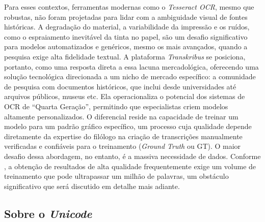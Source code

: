 \documentclass[portuguese]{textolivre}
\begin{document}
Para esses contextos, ferramentas modernas como o \textit{Tesseract OCR}, mesmo que robustas, não foram projetadas para lidar com a ambiguidade visual de fontes históricas. A degradação do material, a variabilidade da impressão e os ruídos, como o espraiamento inevitável da tinta no papel, são um desafio significativo para modelos automatizados e genéricos, mesmo os mais avançados, quando a pesquisa exige alta fidelidade textual. A plataforma \textit{Transkribus} se posiciona, portanto, como uma resposta direta a essa lacuna mercadológica, oferecendo uma solução tecnológica direcionada a um nicho de mercado específico: a comunidade de pesquisa com documentos históricos, que inclui desde universidades até arquivos públicos, museus etc. Ela operacionaliza o potencial dos sistemas de OCR de “Quarta Geração”, permitindo que especialistas criem modelos altamente personalizados. O diferencial reside na capacidade de treinar um modelo para um padrão gráfico específico, um processo cuja qualidade depende diretamente da expertise do filólogo na criação de transcrições manualmente verificadas e confiáveis para o treinamento (\textit{Ground Truth }ou GT). O maior desafio dessa abordagem, no entanto, é a massiva necessidade de dados. Conforme \textcite[p.~18]{wang2021object}, a obtenção de resultados de alta qualidade frequentemente exige um volume de treinamento que pode ultrapassar um milhão de palavras, um obstáculo significativo que será discutido em detalhe mais adiante.

\subsection{Sobre o \textit{Unicode}}
\end{document}
